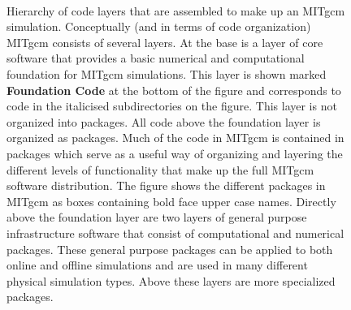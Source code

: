 \begin{figure}
\\
\caption{ Hierarchy of code layers that are assembled to make up an MITgcm
simulation. Conceptually (and in terms of code organization) MITgcm consists
of several layers. At the base is a layer of core software that provides a
basic numerical and computational foundation for MITgcm simulations. This
layer is shown marked {\bf Foundation Code} at the bottom of the figure
and corresponds to code in the italicised subdirectories on the figure.
This layer is not organized into packages. All code above the foundation layer
is organized as packages.  Much of the code in MITgcm is contained in packages
which serve as a useful way of organizing and layering the different levels of
functionality that make up the full MITgcm software distribution.
The figure shows the different packages in MITgcm as boxes containing bold
face upper case names.  Directly above the foundation layer are two layers of
general purpose infrastructure software that consist of computational and
numerical packages.  These general purpose packages can be applied to both
online and offline simulations and are used in many different physical
simulation types.  Above these layers are more specialized packages.  }
\label{fig:package_organigramme}
\end{figure}

